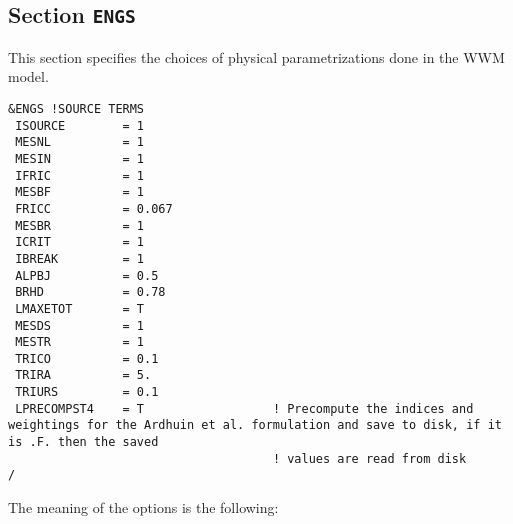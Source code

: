 \documentclass[12pt]{amsart}
\begin{document}
\subsection{Section {\tt ENGS}}
This section specifies the choices of physical parametrizations done in the WWM model.
\begin{verbatim}
&ENGS !SOURCE TERMS
 ISOURCE        = 1
 MESNL          = 1      
 MESIN          = 1      
 IFRIC          = 1              
 MESBF          = 1              
 FRICC          = 0.067          
 MESBR          = 1              
 ICRIT          = 1              
 IBREAK         = 1
 ALPBJ          = 0.5            
 BRHD           = 0.78           
 LMAXETOT       = T              
 MESDS          = 1              
 MESTR          = 1          
 TRICO          = 0.1        
 TRIRA          = 5.       
 TRIURS         = 0.1      
 LPRECOMPST4    = T                  ! Precompute the indices and weightings for the Ardhuin et al. formulation and save to disk, if it is .F. then the saved
                                     ! values are read from disk
/
\end{verbatim}
The meaning of the options is the following:
\end{document}
